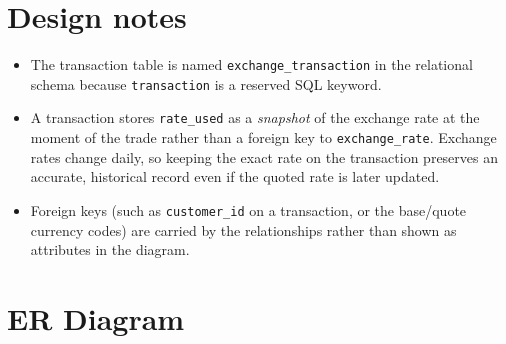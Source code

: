\documentclass[11pt]{article}
\begin{document}
\section*{Design notes}

\begin{itemize}
  \item The transaction table is named \texttt{exchange\_transaction} in the
        relational schema because \texttt{transaction} is a reserved SQL
        keyword.
  \item A transaction stores \texttt{rate\_used} as a \emph{snapshot} of the
        exchange rate at the moment of the trade rather than a foreign key to
        \texttt{exchange\_rate}. Exchange rates change daily, so keeping the
        exact rate on the transaction preserves an accurate, historical record
        even if the quoted rate is later updated.
  \item Foreign keys (such as \texttt{customer\_id} on a transaction, or the
        base/quote currency codes) are carried by the relationships rather than
        shown as attributes in the diagram.
\end{itemize}

\section*{ER Diagram}
\end{document}
